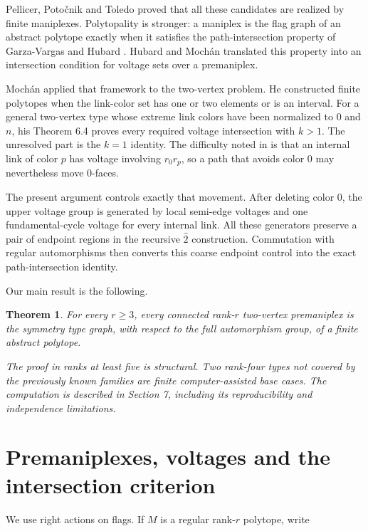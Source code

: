 \documentclass[11pt]{article}
\newtheorem{theorem}{Theorem}
\begin{document}
Pellicer, Poto\v{c}nik and Toledo \cite{ppt2019} proved that all these candidates are realized by finite
maniplexes. Polytopality is stronger: a maniplex is the flag graph of an abstract polytope exactly
when it satisfies the path-intersection property of Garza-Vargas and Hubard \cite{gvh2018}. Hubard and Mochán
\cite{hm2023} translated this property into an intersection condition for voltage sets over a premaniplex.

Mochán \cite{mochan2024} applied that framework to the two-vertex problem. He constructed finite polytopes when
the link-color set has one or two elements or is an interval. For a general two-vertex type whose
extreme link colors have been normalized to $0$ and $n$, his Theorem 6.4 proves every required
voltage intersection with $k>1$. The unresolved part is the $k=1$ identity. The difficulty noted in
\cite{mochan2024} is that an internal link of color $p$ has voltage involving $r_0r_p$, so a path that avoids color
$0$ may nevertheless move $0$-faces.

The present argument controls exactly that movement. After deleting color $0$, the upper voltage
group is generated by local semi-edge voltages and one fundamental-cycle voltage for every internal
link. All these generators preserve a pair of endpoint regions in the recursive $\widehat 2$
construction. Commutation with regular automorphisms then converts this coarse endpoint control
into the exact path-intersection identity.

Our main result is the following.

\begin{theorem}

For every $r\geq3$, every connected rank-$r$ two-vertex premaniplex is the symmetry type graph,
with respect to the full automorphism group, of a finite abstract polytope.

The proof in ranks at least five is structural. Two rank-four types not covered by the previously
known families are finite computer-assisted base cases. The computation is described in Section 7,
including its reproducibility and independence limitations.

\end{theorem}

\section{Premaniplexes, voltages and the intersection criterion}

We use right actions on flags. If $M$ is a regular rank-$r$ polytope, write
\end{document}

